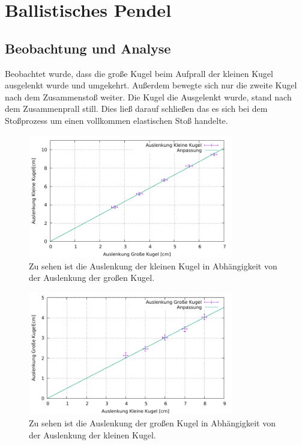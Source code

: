 \section{Ballistisches Pendel}\label{kap:Bal}
\subsection*{Beobachtung und Analyse}
Beobachtet wurde, dass die große Kugel beim Aufprall der kleinen Kugel ausgelenkt wurde und umgekehrt. Außerdem bewegte sich nur die zweite Kugel nach dem Zusammenstoß weiter. Die Kugel die Ausgelenkt wurde, stand nach dem Zusammenprall still. Dies ließ darauf schließen das es sich bei dem Stoßprozess um einen vollkommen elastischen Stoß handelte.

\begin{figure}[h]
	\centering
	\includegraphics[width=0.8\textwidth]{res/GrosKlein.pdf}
	\caption{Zu sehen ist die Auslenkung der kleinen Kugel in Abhängigkeit von der Auslenkung der großen Kugel.}
	\label{fig:grosklein}
\end{figure}
\begin{figure}[h]
	\centering
	\includegraphics[width=0.8\textwidth]{res/KleinGros.pdf}
	\caption{Zu sehen ist die Auslenkung der großen Kugel in Abhängigkeit von der Auslenkung der kleinen Kugel.}
	\label{fig:kleingros}
\end{figure}

